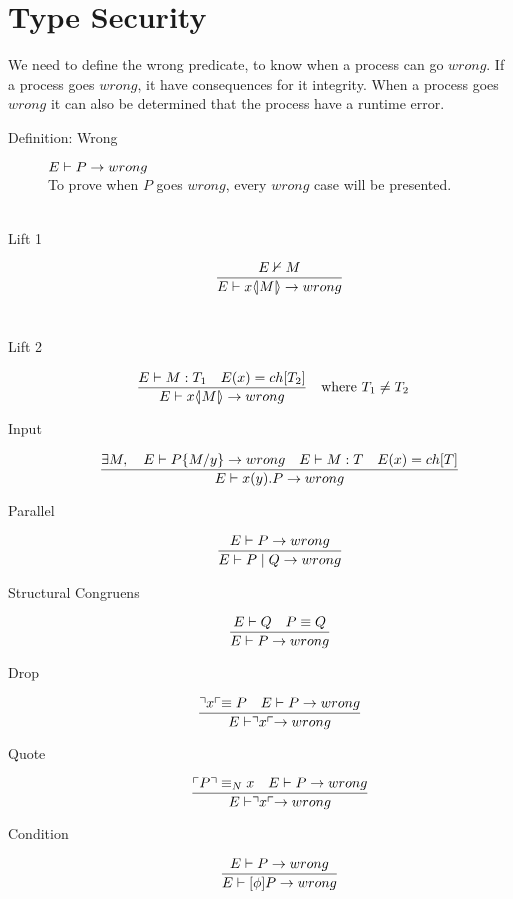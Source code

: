 \section{Type Security}

We need to define the wrong predicate, to know when a process can go $wrong$. If a process goes $wrong$, it have consequences for it integrity. When a process goes $wrong$ it can also be determined that the process have a runtime error.
\begin{description}
    \item[Definition: Wrong]
    $E \vdash P \rightarrow wrong$ \\
    
    To prove when $P$ goes $wrong$, every $wrong$ case will be presented.\\\\
    \item[Lift 1] \begin{align*}
        \frac{E \nvdash M}{E \vdash x \langle \! | M | \! \rangle \rightarrow wrong}
    \end{align*}\\
        
    \item[Lift 2] \begin{align*}
            \frac{E \vdash M:T_1 \quad E(x)=ch[T_2]}{E \vdash x \langle \! | M | \! \rangle \rightarrow wrong} &\quad \text{where}\ T_1 \neq T_2
    \end{align*}

    \item[Input] \begin{align*}
        \frac{\exists M,\quad E \vdash P\{ M/ y\} \rightarrow wrong \quad E \vdash M:T \quad E(x)= ch[T]} {E \vdash x(y).P \rightarrow wrong}\\
    \end{align*}

    \item[Parallel] \begin{align*}
        \frac{E \vdash P \rightarrow wrong}{E \vdash P \mid Q \rightarrow wrong}
    \end{align*}

    \item[Structural Congruens] \begin{align*}
        \frac{E \vdash Q \quad P \equiv Q}{E \vdash P \rightarrow wrong}
    \end{align*}

    \item[Drop]\begin{align*}
        \frac{\urcorner x \ulcorner \equiv P \quad E \vdash P \rightarrow wrong}{E \vdash \urcorner x \ulcorner \rightarrow wrong}
    \end{align*}

    \item[Quote]\begin{align*}
        \frac{\ulcorner P \urcorner \equiv _N x \quad E \vdash P \rightarrow wrong}{E \vdash \urcorner x \ulcorner \rightarrow wrong}
    \end{align*}

    \item[Condition]\begin{align*}
        \frac{E \vdash P \rightarrow wrong}{E \vdash [\phi]P \rightarrow wrong}
    \end{align*}
\end{description}
